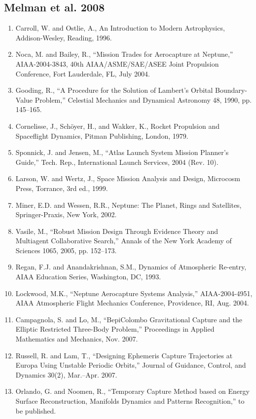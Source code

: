 \documentclass[12pt]{article}
\begin{document}
\subsection*{Melman et al. 2008}
\begin{enumerate}
\item Carroll, W. and Ostlie, A., An Introduction to Modern Astrophysics, Addison-Wesley, Reading, 1996.
\item Noca, M. and Bailey, R., ``Mission Trades for Aerocapture at Neptune,'' AIAA-2004-3843, 40th AIAA/ASME/SAE/ASEE Joint Propulsion Conference, Fort Lauderdale, FL, July 2004.
\item Gooding, R., ``A Procedure for the Solution of Lambert’s Orbital Boundary-Value Problem,'' Celestial Mechanics and Dynamical Astronomy 48, 1990, pp. 145--165.
\item Cornelisse, J., Schöyer, H., and Wakker, K., Rocket Propulsion and Spaceflight Dynamics, Pitman Publishing, London, 1979.
\item Sponnick, J. and Jensen, M., ``Atlas Launch System Mission Planner’s Guide,'' Tech. Rep., International Launch Services, 2004 (Rev. 10).
\item Larson, W. and Wertz, J., Space Mission Analysis and Design, Microcosm Press, Torrance, 3rd ed., 1999.
\item Miner, E.D. and Wessen, R.R., Neptune: The Planet, Rings and Satellites, Springer-Praxis, New York, 2002.
\item Vasile, M., ``Robust Mission Design Through Evidence Theory and Multiagent Collaborative Search,'' Annals of the New York Academy of Sciences 1065, 2005, pp. 152--173.
\item Regan, F.J. and Anandakrishnan, S.M., Dynamics of Atmospheric Re-entry, AIAA Education Series, Washington, DC, 1993.
\item Lockwood, M.K., ``Neptune Aerocapture Systems Analysis,'' AIAA-2004-4951, AIAA Atmospheric Flight Mechanics Conference, Providence, RI, Aug. 2004.
\item Campagnola, S. and Lo, M., ``BepiColombo Gravitational Capture and the Elliptic Restricted Three-Body Problem,'' Proceedings in Applied Mathematics and Mechanics, Nov. 2007.
\item Russell, R. and Lam, T., ``Designing Ephemeris Capture Trajectories at Europa Using Unstable Periodic Orbits,'' Journal of Guidance, Control, and Dynamics 30(2), Mar.--Apr. 2007.
\item Orlando, G. and Noomen, R., ``Temporary Capture Method based on Energy Surface Reconstruction, Manifolds Dynamics and Patterns Recognition,'' to be published.

\end{enumerate}
\end{document}
